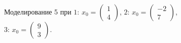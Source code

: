 \documentclass[a5paper, 10pt]{article}
\theoremstyle{definition}
\theoremstyle{plain}
\theoremstyle{remark}
\begin{document}
\begin{figure}[h!]
\caption{Моделирование 5 при  $1: \, x_0 = \begin{pmatrix} 1 \\ 4 \end{pmatrix}$, $2: \, x_0 = \begin{pmatrix} -2 \\ 7 \end{pmatrix}$, $3: \, x_0 = \begin{pmatrix} 9 \\ 3 \end{pmatrix}$.}
\end{figure}
\end{document}
